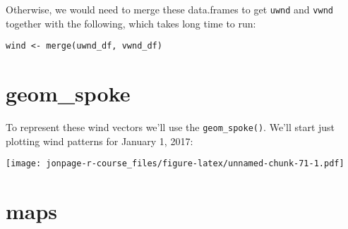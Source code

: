 \documentclass[]{book}
\newenvironment{Shaded}{\begin{snugshade}}{\end{snugshade}}
\newcommand{\KeywordTok}[1]{\textcolor[rgb]{0.13,0.29,0.53}{\textbf{{#1}}}}
\newcommand{\DataTypeTok}[1]{\textcolor[rgb]{0.13,0.29,0.53}{{#1}}}
\newcommand{\DecValTok}[1]{\textcolor[rgb]{0.00,0.00,0.81}{{#1}}}
\newcommand{\StringTok}[1]{\textcolor[rgb]{0.31,0.60,0.02}{{#1}}}
\newcommand{\NormalTok}[1]{{#1}}
\theoremstyle{definition}
\theoremstyle{definition}
\theoremstyle{remark}
\begin{document}
Otherwise, we would need to merge these data.frames to get \texttt{uwnd}
and \texttt{vwnd} together with the following, which takes long time to
run:

\begin{verbatim}
wind <- merge(uwnd_df, vwnd_df)
\end{verbatim}

\hypertarget{geom_spoke}{\section{geom\_spoke}\label{geom_spoke}}

To represent these wind vectors we'll use the \texttt{geom\_spoke()}.
We'll start just plotting wind patterns for January 1, 2017:

\begin{Shaded}
\end{Shaded}

\texttt{[image: jonpage-r-course\_files/figure-latex/unnamed-chunk-71-1.pdf]}

\section{maps}\label{maps}
\end{document}
